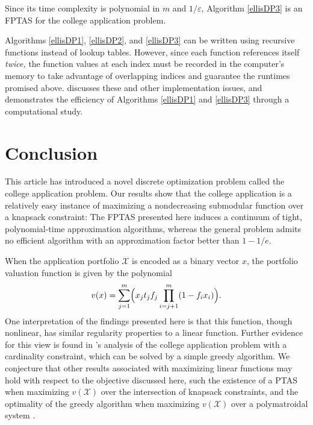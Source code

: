 Since its time complexity is polynomial in $m$ and $1 / \varepsilon$, Algorithm \ref{ellisDP3} is an FPTAS for the college application problem.

Algorithms \ref{ellisDP1}, \ref{ellisDP2}, and \ref{ellisDP3} can be written using recursive functions instead of lookup tables. However, since each function references itself \emph{twice,} the function values at each index must be recorded in the computer's memory to take advantage of overlapping indices and guarantee the runtimes promised above. \cite{kapur2022} discusses these and other implementation issues, and demonstrates the efficiency of Algorithms \ref{ellisDP1} and \ref{ellisDP3} through a computational study.









\section{Conclusion} \label{sectionConclusion}

This article has introduced a novel discrete optimization problem called the college application problem. Our results show that the college application is a relatively easy instance of maximizing a nondecreasing submodular function over a knapsack constraint: The FPTAS presented here induces a continuum of tight, polynomial-time approximation algorithms, whereas the general problem admits no efficient algorithm with an approximation factor better than $1 - 1/e$.

When the application portfolio $\mathcal{X}$ is encoded as a binary vector $x$, the portfolio valuation function is given by the polynomial
\begin{equation} 
v(x) = \sum_{j=1}^m \Bigl( x_j t_j f_j \prod_{i = j+1}^m (1 - f_{i} x_{i}) \Bigr). \label{closedformportfoliovaluationx}\end{equation}
One interpretation of the findings presented here is that this function, though nonlinear, has similar regularity properties to a linear function. Further evidence for this view is found in \cite{kapur2022}'s analysis of the college application problem with a cardinality constraint, which can be solved by a simple greedy algorithm. We conjecture that other results associated with maximizing linear functions may hold with respect to the objective discussed here, such the existence of a PTAS when maximizing $v(\mathcal{X})$ over the intersection of knapsack constraints, and the optimality of the greedy algorithm when maximizing $v(\mathcal{X})$ over a polymatroidal system \cite{chekuriandkhanna2005,edmonds1971}.

